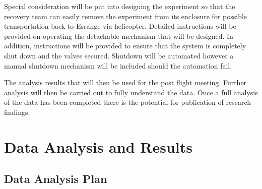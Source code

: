 \documentclass[a4paper,12pt,twoside]{article}
\begin{document}
Special consideration will be put into designing the experiment so that the recovery team can easily remove the experiment from its enclosure for possible transportation back to Esrange via helicopter. Detailed instructions will be provided on operating the detachable mechanism that will be designed. In addition, instructions will be provided to ensure that the system is completely shut down and the valves secured. Shutdown will be automated however a manual shutdown mechanism will be included should the automation fail.

The analysis results that will then be used for the post flight meeting. Further analysis will then be carried out to fully understand the data. Once a full analysis of the data has been completed there is the potential for publication of research findings.



\pagebreak
\section{Data Analysis and Results}

\subsection{Data Analysis Plan}
\end{document}
